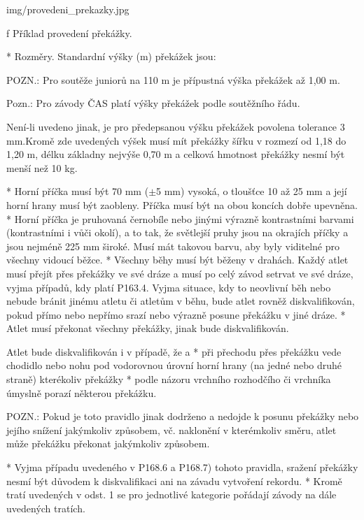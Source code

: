 \picw=5cm \inspic img/provedeni_prekazky.jpg
\caption/f Příklad provedení překážky.

* Rozměry. Standardní výšky (m) překážek jsou:


POZN.: Pro soutěže juniorů na 110 m je přípustná výška překážek až 1,00 m.

Pozn.: Pro závody ČAS platí výšky překážek podle soutěžního řádu.

Není-li uvedeno jinak, je pro předepsanou výšku překážek povolena tolerance 3 mm.Kromě zde uvedených výšek musí mít překážky šířku v rozmezí od 1,18 do 1,20 m, délku základny nejvýše 0,70 m a celková hmotnost překážky nesmí být menší než 10 kg.

* Horní příčka musí být 70 mm ($\pm$5 mm) vysoká, o tloušťce 10 až 25 mm a její horní hrany musí být zaobleny. Příčka musí být na obou koncích dobře upevněna.
* Horní příčka je pruhovaná černobíle nebo jinými výrazně kontrastními barvami (kontrastními i vůči okolí), a to tak, že světlejší pruhy jsou na okrajích příčky a jsou nejméně 225 mm široké. Musí mát takovou barvu, aby byly viditelné pro všechny vidoucí běžce.
* Všechny běhy musí být běženy v drahách. Každý atlet musí přejít přes překážky ve své dráze a musí po celý závod setrvat ve své dráze, vyjma případů, kdy platí P163.4. Vyjma situace, kdy to neovlivní běh nebo nebude bránit jinému atletu či atletům v běhu, bude atlet rovněž diskvalifikován, pokud přímo nebo nepřímo srazí nebo výrazně posune překážku v jiné dráze.
* Atlet musí překonat všechny překážky, jinak bude diskvalifikován.

Atlet bude diskvalifikován i v případě, že
  \begitems \style a
  * při přechodu přes překážku vede chodidlo nebo nohu pod vodorovnou úrovní horní hrany (na jedné nebo druhé straně) kterékoliv překážky
  * podle názoru vrchního rozhodčího či vrchníka úmyslně porazí některou překážku.
  \enditems

POZN.: Pokud je toto pravidlo jinak dodrženo a nedojde k posunu překážky nebo jejího snížení jakýmkoliv způsobem, vč. naklonění v kterémkoliv směru, atlet může překážku překonat jakýmkoliv způsobem.

* Vyjma případu uvedeného v P168.6 a  P168.7) tohoto pravidla, sražení překážky nesmí být důvodem k diskvalifikaci ani na závadu vytvoření rekordu.
* Kromě tratí uvedených v odst. 1 se pro jednotlivé kategorie pořádají závody na dále uvedených tratích.

